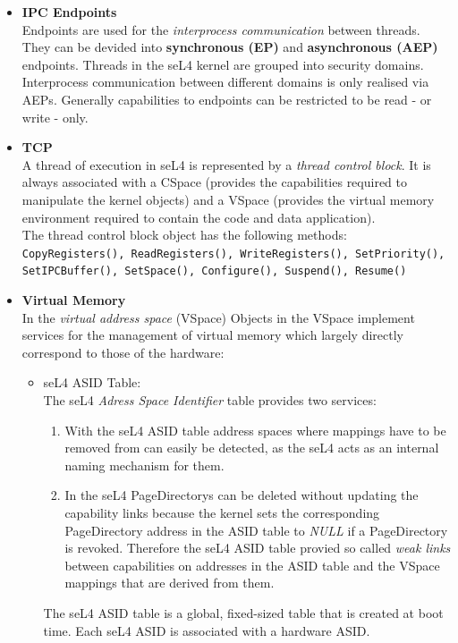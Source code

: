 \begin{itemize}
\item \textbf{IPC Endpoints} \\
Endpoints are used for the \textit{interprocess communication} between threads. They can be devided into \textbf{synchronous (EP)} and \textbf{asynchronous (AEP)} endpoints. 
Threads in the seL4 kernel are grouped into security domains. Interprocess communication between different domains is only realised via AEPs. Generally capabilities to endpoints can be restricted to be read - or write - only. 
\item \textbf{TCP} \\
A thread of execution in seL4 is represented by a \textit{thread control block}. It is always associated with a CSpace (provides the capabilities required to manipulate the kernel objects) and a VSpace (provides the virtual memory environment required to contain the code and data application). \\
The thread control block object has the following methods: \\
\texttt{CopyRegisters(), ReadRegisters(), WriteRegisters(), SetPriority(), \\ SetIPCBuffer(), SetSpace(), Configure(), Suspend(), Resume()}
\item \textbf{Virtual Memory}\\
In the \textit{virtual address space} (VSpace) Objects in the VSpace implement services for the management of virtual memory which largely directly correspond to those of the hardware: \\
\begin{itemize}
\item seL4 ASID Table: \\
The seL4 \textit{Adress Space Identifier} table provides two services:
\begin{enumerate}
\item With the seL4 ASID table address spaces where mappings have to be removed from can easily be detected, as the seL4 acts as an internal naming mechanism for them.
\item In the seL4 PageDirectorys can be deleted without updating the capability links because the kernel sets the corresponding PageDirectory address in the ASID table to \textit{NULL} if a PageDirectory is revoked. Therefore the seL4 ASID table provied so called \textit{weak links} between capabilities on addresses in the ASID table and the VSpace mappings that are derived from them.
\end{enumerate}
The seL4 ASID table is a global, fixed-sized table that is created at boot time. Each seL4 ASID is associated with a hardware ASID.

\end{itemize}
\end{itemize}
